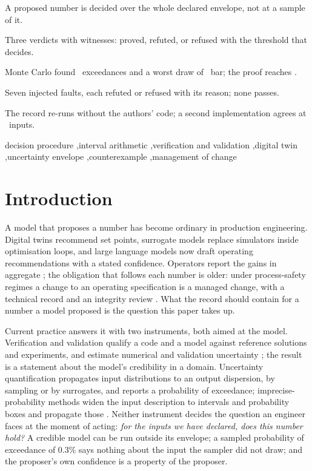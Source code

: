 \documentclass[preprint,11pt,authoryear]{elsarticle}
\begin{document}
\begin{frontmatter}
\begin{abstract}
\end{abstract}

\begin{highlights}
\item A proposed number is decided over the whole declared envelope, not at a sample of it.
\item Three verdicts with witnesses: proved, refuted, or refused with the threshold that decides.
\item Monte Carlo found \MPOver\ exceedances and a worst draw of \MMax\ bar; the proof reaches \GCornerAbove.
\item Seven injected faults, each refuted or refused with its reason; none passes.
\item The record re-runs without the authors' code; a second implementation agrees at \GRefPoints\ inputs.
\end{highlights}

\begin{keyword}
decision procedure \sep interval arithmetic \sep verification and validation \sep digital twin \sep uncertainty envelope \sep counterexample \sep management of change
\end{keyword}

\end{frontmatter}

\section{Introduction}\label{sec:intro}

A model that proposes a number has become ordinary in production engineering. Digital twins recommend set points, surrogate models replace simulators inside optimisation loops, and large language models now draft operating recommendations with a stated confidence. Operators report the gains in aggregate \citep{petrobras2026twins,petrobras2026jubarte}; the obligation that follows each number is older: under process-safety regimes a change to an operating specification is a managed change, with a technical record and an integrity review \citep{anp2007}. What the record should contain for a number a model proposed is the question this paper takes up.

Current practice answers it with two instruments, both aimed at the model. Verification and validation qualify a code and a model against reference solutions and experiments, and estimate numerical and validation uncertainty \citep{asme2009,nasa2016,oberkampf2010,roy2011}; the result is a statement about the model's credibility in a domain. Uncertainty quantification propagates input distributions to an output dispersion, by sampling or by surrogates, and reports a probability of exceedance; imprecise-probability methods widen the input description to intervals and probability boxes and propagate those \citep{ferson1996,beer2013}. Neither instrument decides the question an engineer faces at the moment of acting: \emph{for the inputs we have declared, does this number hold?} A credible model can be run outside its envelope; a sampled probability of exceedance of 0.3\% says nothing about the input the sampler did not draw; and the proposer's own confidence is a property of the proposer.
\end{document}
